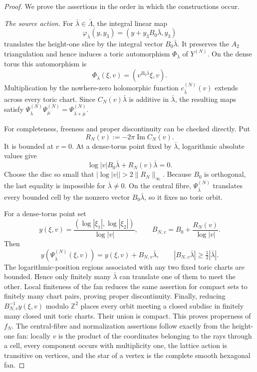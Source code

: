 \begin{proof}
We prove the assertions in the order in which the constructions occur.

\medskip\noindent
\emph{The source action.}
For $\bar\lambda\in\bar\Lambda$, the integral linear map
\[
 \varphi_{\bar\lambda}(y,y_3)
 =(y+y_3B_0\bar\lambda,y_3)
\]
translates the height-one slice by the integral vector
$B_0\bar\lambda$.  It preserves the $A_2$ triangulation and hence induces
a toric automorphism $\Phi_{\bar\lambda}$ of $Y^{(N)}$.  On the dense
torus this automorphism is
\[
 \Phi_{\bar\lambda}(\xi,v)
 =(v^{B_0\bar\lambda}\xi,v).
\]
Multiplication by the nowhere-zero holomorphic function
$c^{(N)}_{\bar\lambda}(v)$ extends across every toric chart.  Since
$C_N(v)\bar\lambda$ is additive in $\bar\lambda$, the resulting maps
satisfy
$\Psi^{(N)}_{\bar\lambda}\Psi^{(N)}_{\bar\mu}
=\Psi^{(N)}_{\bar\lambda+\bar\mu}$.

For completeness, freeness and proper discontinuity can be checked
directly.  Put
\[
 R_N(v):=-2\pi\operatorname{Im}C_N(v).
\]
It is bounded at $v=0$.  At a dense-torus point fixed by
$\bar\lambda$, logarithmic absolute values give
\[
 \log|v|B_0\bar\lambda+R_N(v)\bar\lambda=0.
\]
Choose the disc so small that
$|\log|v||>2\|R_N\|_\infty$.  Because $B_0$ is orthogonal, the last
equality is impossible for $\bar\lambda\ne0$.  On the central fibre,
$\Psi^{(N)}_{\bar\lambda}$ translates every bounded cell by the nonzero
vector $B_0\bar\lambda$, so it fixes no toric orbit.

For a dense-torus point set
\[
 y(\xi,v)=\frac{(\log|\xi_1|,\log|\xi_2|)}{\log|v|},
 \qquad
 B_{N,v}=B_0+\frac{R_N(v)}{\log|v|}.
\]
Then
\[
 y(\Psi^{(N)}_{\bar\lambda}(\xi,v))
 =y(\xi,v)+B_{N,v}\bar\lambda,
 \qquad
 |B_{N,v}\bar\lambda|\ge\tfrac12|\bar\lambda|.
\]
The logarithmic-position regions associated with any two fixed toric
charts are bounded.  Hence only finitely many $\bar\lambda$ can translate
one of them to meet the other.  Local finiteness of the fan reduces the
same assertion for compact sets to finitely many chart pairs, proving
proper discontinuity.  Finally, reducing
$B_{N,v}^{-1}y(\xi,v)$ modulo $\mathbb Z^2$ places every orbit meeting a
closed subdisc in finitely many closed unit toric charts.  Their union is
compact.  This proves properness of $f_N$.  The central-fibre and
normalization assertions follow exactly from the height-one fan: locally
$v$ is the product of the coordinates belonging to the rays through a
cell, every component occurs with multiplicity one, the lattice action is
transitive on vertices, and the star of a vertex is the complete smooth
hexagonal fan.


\end{proof}
